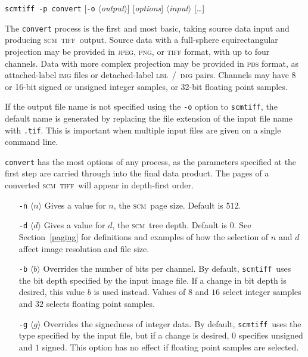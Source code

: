 \documentclass[oneside,11pt]{memoir}
\newcommand{\scm}     {\textsc{scm}}
\newcommand{\tiff}    {\textsc{tiff}}
\newcommand{\scmtiff} {\texttt{scmtiff}}
\newcommand{\inangles}[1]{$\langle$#1$\rangle$}
\begin{document}
\begin{Spacing}{1.1}
\noindent\scmtiff\ \texttt{-p convert} [\texttt{-o} \inangles{\textit{output}}] [\textit{options}] \inangles{\textit{input}} [\ldots]

\bigskip The \texttt{convert} process is the first and most basic, taking source data input and producing \scm\ \tiff\ output. Source data with a full-sphere equirectangular projection may be provided in \textsc{jpeg}, \textsc{png}, or \textsc{tiff} format, with up to four channels. Data with more complex projection may be provided in \textsc{pds} format, as attached-label \textsc{img} files or detached-label \textsc{lbl}~/~\textsc{img} pairs. Channels may have 8 or 16-bit signed or unsigned integer samples, or 32-bit floating point samples.

If the output file name is not specified using the \texttt{-o} option to \scmtiff, the default name is generated by replacing the file extension of the input file name with \texttt{.tif}. This is important when multiple input files are given on a single command line.

\texttt{convert} has the most options of any process, as the parameters specified at the first step are carried through into the final data product. The pages of a converted \scm\ \tiff\ will appear in depth-first order.

\begin{itemize}
\item[\texttt{-n} \inangles{$n$}] Gives a value for $n$, the \scm\ page size. Default is $512$.

\item[\texttt{-d} \inangles{$d$}] Gives a value for $d$, the \scm\ tree depth. Default is $0$. See Section~\ref{paging} for definitions and examples of how the selection of $n$ and $d$ affect image resolution and file size.

  \item[\texttt{-b} \inangles{$b$}] Overrides the number of bits per channel. By default, \scmtiff\ uses the bit depth specified by the input image file. If a change in bit depth is desired, this value $b$ is used instead. Values of $8$ and $16$ select integer samples and $32$ selects floating point samples.

\item[\texttt{-g} \inangles{$g$}] Overrides the signedness of integer data. By default, \scmtiff\ uses the type specified by the input file, but if a change is desired, $0$ specifies unsigned and $1$ signed. This option has no effect if floating point samples are selected.


\end{itemize}
\end{Spacing}
\end{document}
